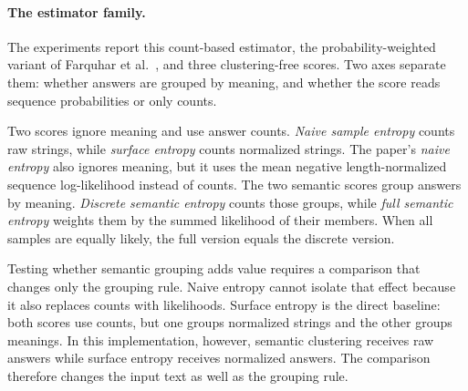\paragraph{The estimator family.}
The experiments report this count-based estimator, the probability-weighted variant
of Farquhar et al.~\cite{semantic_entropy_nature_2024,%
kossen_semantic_uncertainty_code_2024}, and three clustering-free scores. Two
axes separate them: whether answers are grouped by meaning, and whether the
score reads sequence probabilities or only counts.

\begin{center}
\small
{}
\end{center}

Two scores ignore meaning and use answer counts. \emph{Naive sample entropy}
counts raw strings, while \emph{surface entropy} counts normalized strings.
The paper's \emph{naive entropy} also ignores meaning, but it uses the mean
negative length-normalized sequence log-likelihood instead of counts. The two
semantic scores group answers by meaning. \emph{Discrete semantic entropy}
counts those groups, while \emph{full semantic entropy} weights them by the
summed likelihood of their members. When all samples are equally likely, the
full version equals the discrete version.

Testing whether semantic grouping adds value requires a comparison that changes
only the grouping rule. Naive entropy cannot isolate that effect because it
also replaces counts with likelihoods. Surface entropy is the direct baseline:
both scores use counts, but one groups normalized strings and the other groups
meanings. In this implementation, however, semantic clustering receives raw
answers while surface entropy receives normalized answers. The comparison
therefore changes the input text as well as the grouping rule.

